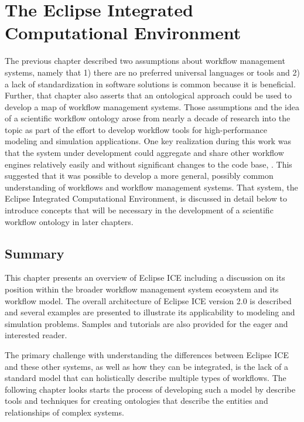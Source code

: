 \chapter{The Eclipse Integrated Computational Environment} \label{ch:eclipse-ice}

The previous chapter described two assumptions about workflow management
systems, namely that 1) there are no preferred universal languages or tools
and 2) a lack of standardization in software solutions is common because it is
beneficial. Further, that chapter also asserts that an ontological approach
could be used to develop a map of workflow management systems. Those assumptions
and the idea of a scientific workflow ontology arose from nearly a decade of
research into the topic as part of the effort to develop workflow tools for
high-performance modeling and simulation applications. One key realization
during this work was that the system under development could aggregate and share
other workflow engines relatively easily and without significant changes to the
code base, \cite{brooks_introducing_2016}. This suggested that it was possible
to develop a more general, possibly common understanding of workflows and
workflow management systems. That system, the Eclipse Integrated Computational
Environment, is discussed in detail below to introduce concepts that will be
necessary in the development of a scientific workflow ontology in later
chapters.


\section{Summary}

This chapter presents an overview of Eclipse ICE including a discussion on its
position within the broader workflow management system ecosystem and its
workflow model. The overall architecture of Eclipse ICE version 2.0 is described
and several examples are presented to illustrate its applicability to modeling
and simulation problems. Samples and tutorials are also provided for the
eager and interested reader.


The primary challenge with understanding the differences between Eclipse ICE and
these other systems, as well as how they can be integrated, is the lack of a
standard model that can holistically describe multiple types of workflows. The
following chapter looks starts the process of developing such a model by
describe tools and techniques for creating ontologies that describe the entities
and relationships of complex systems.
